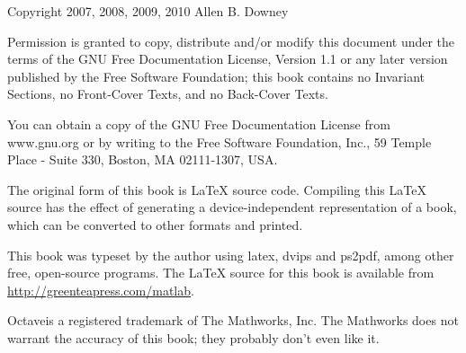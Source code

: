 \begin{latexonly}



\maketitle

\vspace{2in}

\begin{center}
{\Large \thetitle}

\vspace{0.25in}

Copyright 2007, 2008, 2009, 2010 Allen B. Downey
\end{center}

\vspace{0.25in}

Permission is granted to copy, distribute and/or modify this
document under the terms of the GNU Free Documentation License,
Version 1.1 or any later version published by the Free Software
Foundation; this book contains no Invariant Sections,
no Front-Cover Texts, and no Back-Cover Texts.

You can obtain a copy of the GNU Free Documentation License
from www.gnu.org or by writing to the Free Software Foundation,
Inc., 59 Temple Place - Suite 330, Boston, MA 02111-1307, USA.

The original form of this book is LaTeX source code.
Compiling this LaTeX source has the effect of generating
a device-independent representation of a book, which
can be converted to other formats and printed.

This book was typeset by the author using latex, dvips and ps2pdf,
among other free, open-source programs.
The LaTeX source for this book is available from
\url{http://greenteapress.com/matlab}.

Octave\myreg is a registered trademark of The
Mathworks, Inc. The Mathworks does not warrant the accuracy
of this book; they probably don't even like it.

\frontmatter

\end{latexonly}






